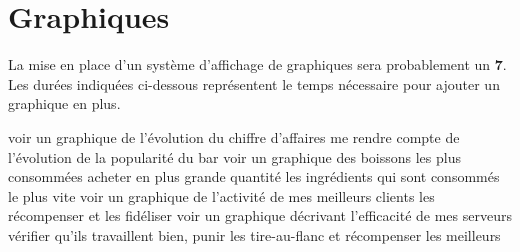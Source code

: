 \documentclass[a4paper,10pt]{article}
\begin{document}
\section{Graphiques}

La mise en place d'un système d'affichage de graphiques sera probablement un \textbf{7}.
Les durées indiquées ci-dessous représentent le temps nécessaire pour ajouter un graphique en plus.

{voir un graphique de l'évolution du chiffre d'affaires}
{me rendre compte de l'évolution de la popularité du bar}
{voir un graphique des boissons les plus consommées}
{acheter en plus grande quantité les ingrédients qui sont consommés le plus vite}
{voir un graphique de l'activité de mes meilleurs clients}
{les récompenser et les fidéliser}
{voir un graphique décrivant l'efficacité de mes serveurs}
{vérifier qu'ils travaillent bien, punir les tire-au-flanc et récompenser les meilleurs}
\end{document}
